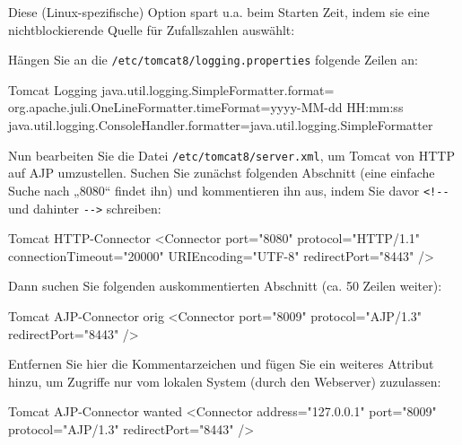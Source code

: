 \begin{minipage}{\linewidth}
Diese (Linux-spezifische) Option spart u.a. beim Starten Zeit,
indem sie eine nichtblockierende Quelle für Zufallszahlen auswählt:

\end{minipage}

\begin{minipage}{\linewidth}
Hängen Sie an die \texttt{/etc/tomcat8/logging.properties} folgende
Zeilen an:

\begin{lstdump}[breaklines=false]{Tomcat Logging}
java.util.logging.SimpleFormatter.format=%
org.apache.juli.OneLineFormatter.timeFormat=yyyy-MM-dd HH:mm:ss
java.util.logging.ConsoleHandler.formatter=java.util.logging.SimpleFormatter
\end{lstdump}
\end{minipage}

\begin{minipage}{\linewidth}
Nun bearbeiten Sie die Datei \texttt{/etc/tomcat8/server.xml}, um Tomcat
von HTTP auf AJP umzustellen. Suchen Sie zunächst folgenden Abschnitt
(eine einfache Suche nach „8080“ findet ihn) und kommentieren ihn aus,
indem Sie davor \texttt{<!‑‑} und dahinter \texttt{‑‑>} schreiben:

\begin{lstdump}[language=XML]{Tomcat HTTP-Connector}
<Connector port="8080" protocol="HTTP/1.1"
           connectionTimeout="20000"
           URIEncoding="UTF-8"
           redirectPort="8443" />
\end{lstdump}
\end{minipage}

\begin{minipage}{\linewidth}
Dann suchen Sie folgenden auskommentierten Abschnitt (ca. 50 Zeilen weiter):

\begin{lstdump}[language=XML]{Tomcat AJP-Connector orig}
<Connector port="8009" protocol="AJP/1.3" redirectPort="8443" />
\end{lstdump}

Entfernen Sie hier die Kommentarzeichen und fügen Sie ein weiteres Attribut
hinzu, um Zugriffe nur vom lokalen System (durch den Webserver) zuzulassen:

\begin{lstdump}[language=XML]{Tomcat AJP-Connector wanted}
<Connector address="127.0.0.1" port="8009" protocol="AJP/1.3" redirectPort="8443" />
\end{lstdump}
\end{minipage}

